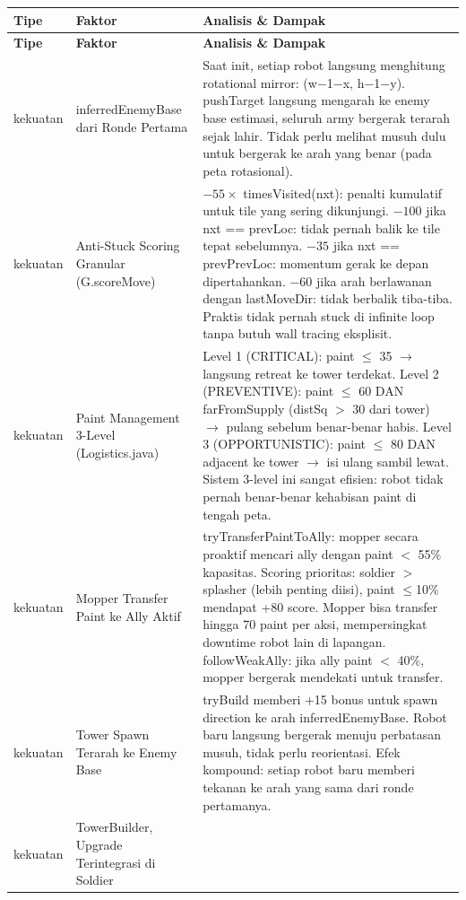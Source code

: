 \documentclass{article}
\begin{document}
\begin{enumerate}[label=\alph*.]
\begin{longtable}{|p{2cm}|p{3.5cm}|p{8.5cm}|}
\hline
\textbf{Tipe} & \textbf{Faktor} & \textbf{Analisis \& Dampak} \\
\hline
\endfirsthead
\hline
\textbf{Tipe} & \textbf{Faktor} & \textbf{Analisis \& Dampak} \\
\hline
\endhead
\hline
\endfoot
kekuatan
& inferredEnemyBase dari Ronde Pertama
& Saat init, setiap robot langsung menghitung rotational mirror: (w$-$1$-$x, h$-$1$-$y).
pushTarget langsung mengarah ke enemy base estimasi, seluruh army bergerak terarah sejak lahir.
Tidak perlu melihat musuh dulu untuk bergerak ke arah yang benar (pada peta rotasional). \\
\hline
kekuatan
& Anti-Stuck Scoring Granular (G.scoreMove)
& $-55 \times$ timesVisited(nxt): penalti kumulatif untuk tile yang sering dikunjungi.
$-100$ jika nxt == prevLoc: tidak pernah balik ke tile tepat sebelumnya.
$-35$ jika nxt == prevPrevLoc: momentum gerak ke depan dipertahankan.
$-60$ jika arah berlawanan dengan lastMoveDir: tidak berbalik tiba-tiba.
Praktis tidak pernah stuck di infinite loop tanpa butuh wall tracing eksplisit. \\
\hline
kekuatan
& Paint Management 3-Level (Logistics.java)
& Level 1 (CRITICAL): paint $\leq$ 35 $\rightarrow$ langsung retreat ke tower terdekat.
Level 2 (PREVENTIVE): paint $\leq$ 60 DAN farFromSupply (distSq $>$ 30 dari tower) $\rightarrow$ pulang sebelum benar-benar habis.
Level 3 (OPPORTUNISTIC): paint $\leq$ 80 DAN adjacent ke tower $\rightarrow$ isi ulang sambil lewat.
Sistem 3-level ini sangat efisien: robot tidak pernah benar-benar kehabisan paint di tengah peta. \\
\hline
kekuatan
& Mopper Transfer Paint ke Ally Aktif
& tryTransferPaintToAlly: mopper secara proaktif mencari ally dengan paint $<$ 55\% kapasitas.
Scoring prioritas: soldier $>$ splasher (lebih penting diisi), paint $\leq$10\% mendapat +80 score.
Mopper bisa transfer hingga 70 paint per aksi, mempersingkat downtime robot lain di lapangan.
followWeakAlly: jika ally paint $<$ 40\%, mopper bergerak mendekati untuk transfer. \\
\hline
kekuatan
& Tower Spawn Terarah ke Enemy Base
& tryBuild memberi +15 bonus untuk spawn direction ke arah inferredEnemyBase.
Robot baru langsung bergerak menuju perbatasan musuh, tidak perlu reorientasi.
Efek kompound: setiap robot baru memberi tekanan ke arah yang sama dari ronde pertamanya. \\
\hline
kekuatan
& TowerBuilder, Upgrade Terintegrasi di Soldier

\end{longtable}
\end{enumerate}
\end{document}
